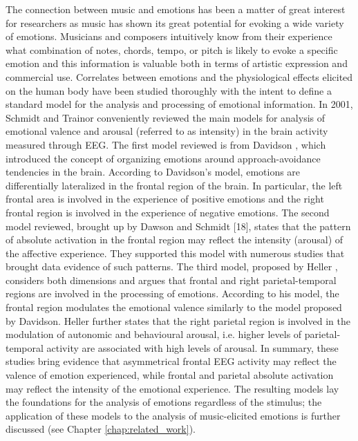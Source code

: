 The connection between music and emotions has been a matter of great interest for researchers as music has shown its great potential for evoking a wide variety of emotions. Musicians and composers intuitively know from their experience what combination of notes, chords, tempo, or pitch is likely to evoke a specific emotion and this information is valuable both in terms of artistic expression and commercial use. Correlates between emotions and the physiological effects elicited on the human body have been studied thoroughly with the intent to define a standard model for the analysis and processing of emotional information. In 2001, Schmidt and Trainor \cite{schmidt_frontal_2001} conveniently reviewed the main models for analysis of emotional valence and arousal (referred to as intensity) in the brain activity measured through EEG. The first model reviewed is from Davidson \cite{davidson_anterior_1992}, which introduced the concept of organizing emotions around approach-avoidance tendencies in the brain. According to Davidson’s model, emotions are differentially lateralized in the frontal region of the brain. In particular, the left frontal area is involved in the experience of positive emotions and the right frontal region is involved in the experience of negative emotions. The second model reviewed, brought up by Dawson \cite{dawson_frontal_1994} and Schmidt [18], states that the pattern of absolute activation in the frontal region may reflect the intensity (arousal) of the affective experience. They supported this model with numerous studies that brought data evidence of such patterns. The third model, proposed by Heller \cite{heller_neuropsychological_1993}, considers both dimensions and argues that frontal and right parietal-temporal regions are involved in the processing of emotions. According to his model, the frontal region modulates the emotional valence similarly to the model proposed by Davidson. Heller further states that the right parietal region is involved in the modulation of autonomic and behavioural arousal, i.e. higher levels of parietal-temporal activity are associated with high levels of arousal. In summary, these studies bring evidence that asymmetrical frontal EEG activity may reflect the valence of emotion experienced, while frontal and parietal absolute activation may reflect the intensity of the emotional experience. The resulting models lay the foundations for the analysis of emotions regardless of the stimulus; the application of these models to the analysis of music-elicited emotions is further discussed (see Chapter \ref{chap:related_work}).

